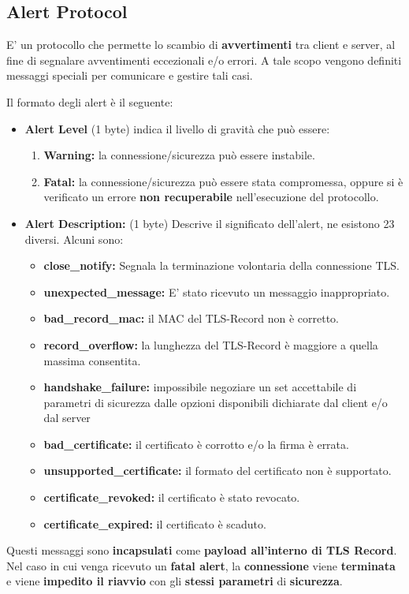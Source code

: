\subsection{Alert Protocol}
\begin{definition}\label{def:alertprot}
E' un protocollo che permette lo scambio  di \textbf{avvertimenti} tra client e server, al fine di segnalare avventimenti eccezionali e/o errori. A tale scopo vengono definiti messaggi speciali per comunicare e gestire tali casi.
\end{definition}
\begin{definition}Il formato degli alert è il seguente:
\begin{itemize}
    \item \textbf{Alert Level} (1 byte) indica il livello di gravità che può essere:
    \begin{enumerate}
        \item \textbf{Warning:} la connessione/sicurezza può essere instabile.
        \item \textbf{Fatal:} la connessione/sicurezza può essere stata compromessa, oppure si è verificato un errore \textbf{non recuperabile} nell'esecuzione del protocollo.
    \end{enumerate}
    \item \textbf{Alert Description:} (1 byte) Descrive il significato dell'alert, ne esistono 23 diversi. Alcuni sono:
    \begin{itemize}
        \item \textbf{close\_notify:} Segnala la terminazione volontaria della connessione TLS.
        \item \textbf{unexpected\_message:} E' stato ricevuto un messaggio inappropriato.
        \item \textbf{bad\_record\_mac:} il MAC del TLS-Record non è corretto.
        \item \textbf{record\_overflow:} la lunghezza del TLS-Record è maggiore a quella massima consentita.
        \item \textbf{handshake\_failure:} impossibile negoziare un set accettabile di parametri di sicurezza dalle opzioni disponibili dichiarate dal client e/o dal server
        \item \textbf{bad\_certificate:} il certificato è corrotto e/o la firma è errata.
        \item \textbf{unsupported\_certificate:} il formato del certificato non è supportato.
        \item \textbf{certificate\_revoked:} il certificato è stato revocato.
        \item \textbf{certificate\_expired:} il certificato è scaduto.
    \end{itemize}
\end{itemize}
Questi messaggi sono \textbf{incapsulati} come \textbf{payload all’interno di TLS Record}. Nel caso in cui venga ricevuto un \textbf{fatal alert}, la \textbf{connessione} viene \textbf{terminata} e viene \textbf{impedito il riavvio} con gli \textbf{stessi parametri} di \textbf{sicurezza}.
\end{definition}
